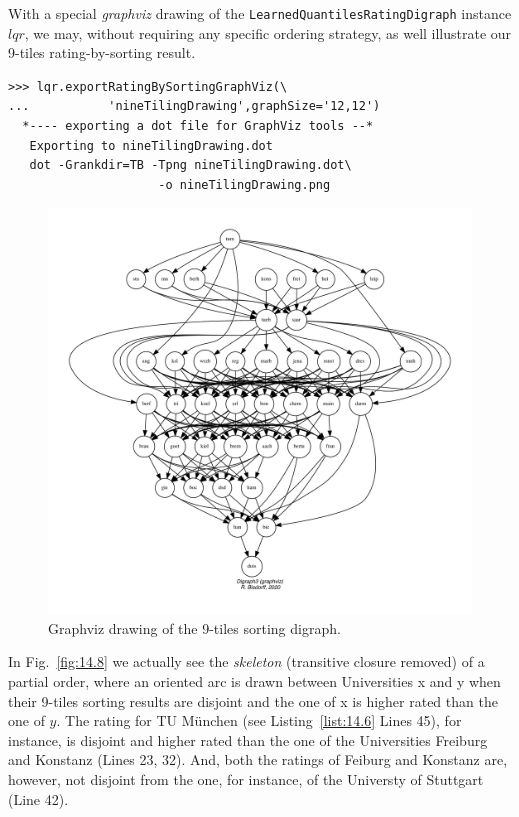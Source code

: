 With a special \emph{graphviz} drawing of the \texttt{LearnedQuantilesRatingDigraph} instance $lqr$, we may, without requiring any specific ordering strategy, as well illustrate our 9-tiles rating-by-sorting result.
\begin{lstlisting}
>>> lqr.exportRatingBySortingGraphViz(\
...           'nineTilingDrawing',graphSize='12,12')
  *---- exporting a dot file for GraphViz tools --*
   Exporting to nineTilingDrawing.dot
   dot -Grankdir=TB -Tpng nineTilingDrawing.dot\
                     -o nineTilingDrawing.png
\end{lstlisting}
\begin{figure}[ht]
\includegraphics[width=\hsize]{Figures/14-8-nineTilingDrawing.pdf}
\caption{Graphviz drawing of the 9-tiles sorting digraph.}
\label{fig:14.8}       %
\end{figure}
\clearpage

In Fig.~\vref{fig:14.8} we actually see the \emph{skeleton} (transitive closure removed) of a partial order, where an oriented arc is drawn between Universities x and y when their 9-tiles sorting results are disjoint and the one of x is higher rated than the one of $y$. The rating for TU München (see Listing~\vref{list:14.6} Lines 45), for instance, is disjoint and higher rated than the one of the Universities Freiburg and Konstanz (Lines 23, 32). And, both the ratings of Feiburg and Konstanz are, however, not disjoint from the one, for instance, of the Universty of Stuttgart (Line 42).

